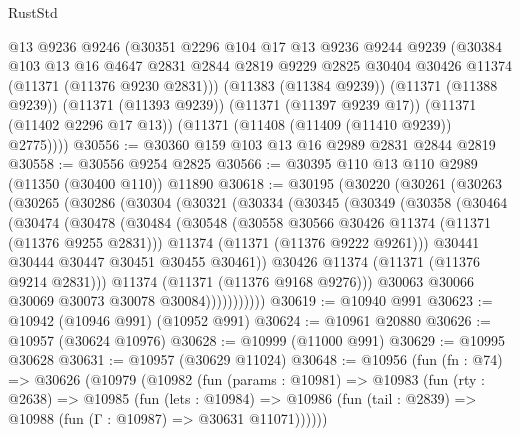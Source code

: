 \begin{lexlean}{RustStd}
\begin{coremodule}
      @13
      @9236
      @9246
      (@30351
        @2296
        @104
        @17
        @13
        @9236
        @9244
        @9239
        (@30384
          @103
          @13
          @16
          @4647
          @2831
          @2844
          @2819
          @9229
          @2825
          @30404
          @30426
          @11374
          (@11371 (@11376 @9230 @2831)))
        (@11383 (@11384 @9239))
        (@11371 (@11388 @9239))
        (@11371 (@11393 @9239))
        (@11371 (@11397 @9239 @17))
        (@11371 (@11402 @2296 @17 @13))
        (@11371 (@11408 (@11409 (@11410 @9239)) @2775))))
@30556 := @30360 @159 @103 @13 @16 @2989 @2831 @2844 @2819
@30558 := @30556 @9254 @2825
@30566 := @30395 @110 @13 @110 @2989 (@11350 (@30400 @110)) @11890
@30618 := @30195
    (@30220
      (@30261
        (@30263
          (@30265
            (@30286
              (@30304
                (@30321
                  (@30334
                    (@30345
                      (@30349
                        (@30358
                          (@30464
                            (@30474
                              (@30478
                                (@30484
                                  (@30548
                                    (@30558 @30566 @30426 @11374 (@11371 (@11376 @9255 @2831)))
                                    @11374
                                    (@11371 (@11376 @9222 @9261)))
                                  @30441
                                  @30444
                                  @30447
                                  @30451
                                  @30455
                                  @30461))
                              @30426
                              @11374
                              (@11371 (@11376 @9214 @2831)))
                            @11374
                            (@11371 (@11376 @9168 @9276)))
                          @30063
                          @30066
                          @30069
                          @30073
                          @30078
                          @30084)))))))))))
@30619 := @10940 @991
@30623 := @10942 (@10946 @991) (@10952 @991)
@30624 := @10961 @20880
@30626 := @10957 (@30624 @10976)
@30628 := @10999 (@11000 @991)
@30629 := @10995 @30628
@30631 := @10957 (@30629 @11024)
@30648 := @10956
    (fun (fn : @74) =>
    @30626
      (@10979
        (@10982
          (fun (params : @10981) =>
          @10983
            (fun (rty : @2638) =>
            @10985
              (fun (lets : @10984) =>
              @10986 (fun (tail : @2839) => @10988 (fun (Γ : @10987) => @30631 @11071))))))

\end{coremodule}
\end{lexlean}

